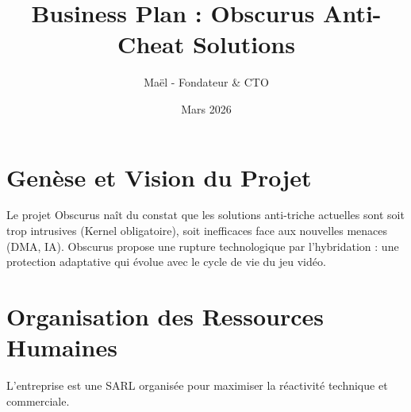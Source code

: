 \documentclass[12pt,a4paper]{article}
\title{\textbf{Business Plan : Obscurus Anti-Cheat Solutions}}
\author{Maël - Fondateur \& CTO}
\date{Mars 2026}
\begin{document}
\maketitle
\tableofcontents
\newpage

\section{Genèse et Vision du Projet}
Le projet Obscurus naît du constat que les solutions anti-triche actuelles sont soit trop intrusives (Kernel obligatoire), soit inefficaces face aux nouvelles menaces (DMA, IA). Obscurus propose une rupture technologique par l'hybridation : une protection adaptative qui évolue avec le cycle de vie du jeu vidéo.

\section{Organisation des Ressources Humaines}
L'entreprise est une SARL organisée pour maximiser la réactivité technique et commerciale.
\end{document}
